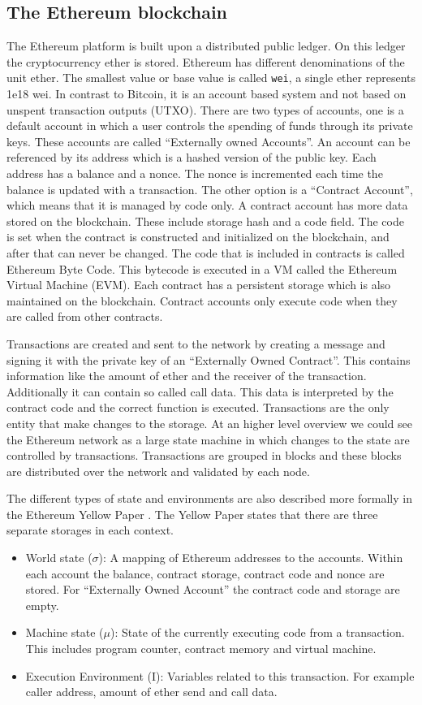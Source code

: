 \documentclass[a4paper]{article}
\begin{document}
\subsection{The Ethereum blockchain}
The Ethereum platform is built upon a distributed public ledger. On this ledger the cryptocurrency ether is stored. Ethereum has different denominations of the unit ether. The smallest value or base value is called \texttt{wei}, a single ether represents 1e18 wei. In contrast to Bitcoin, it is an account based system and not based on unspent transaction outputs (UTXO). There are two types of accounts, one is a default account in which a user controls the spending of funds through its private keys. These accounts are called ``Externally owned Accounts''. An account can be referenced by its address which is a hashed version of the public key. Each address has a balance and a nonce. The nonce is incremented each time the balance is updated with a transaction. The other option is a ``Contract Account'', which means that it is managed by code only. A contract account has more data stored on the blockchain. These include storage hash and a code field. The code is set when the contract is constructed and initialized on the blockchain, and after that can never be changed. The code that is included in contracts is called Ethereum Byte Code. This bytecode is executed in a VM called the Ethereum Virtual Machine (EVM). Each contract has a persistent storage which is also maintained on the blockchain. Contract accounts only execute code when they are called from other contracts.\par
Transactions are created and sent to the network by creating a message and signing it with the private key of an ``Externally Owned Contract''. This contains information like the amount of ether and the receiver of the transaction. Additionally it can contain so called call data. This data is interpreted by the contract code and the correct function is executed. Transactions are the only entity that make changes to the storage. At an higher level overview we could see the Ethereum network as a large state machine in which changes to the state are controlled by transactions. Transactions are grouped in blocks and these blocks are distributed over the network and validated by each node. \par
The different types of state and environments are also described more formally in the Ethereum Yellow Paper \cite{wood2014ethereum}. The Yellow Paper states that there are three separate storages in each context.
\begin{itemize}
    \item World state ($\sigma$): A mapping of Ethereum addresses to the accounts. Within each account the balance, contract storage, contract code and nonce are stored. For ``Externally Owned Account'' the contract code and storage are empty.
    \item  Machine state ($\mu$): State of the currently executing code from a transaction. This includes program counter, contract memory and virtual machine.
    \item Execution Environment (I): Variables related to this transaction. For example caller address, amount of ether send and call data.
\end{itemize}
\end{document}
